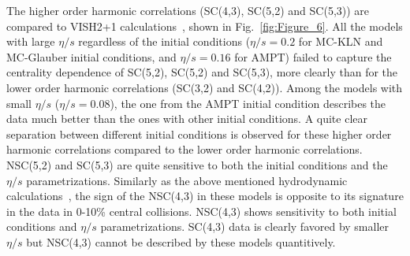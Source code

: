 The higher order harmonic correlations (SC(4,3), SC(5,2) and SC(5,3)) are compared to VISH2+1 calculations~\cite{Zhu:2016puf}, shown in Fig.~\ref{fig:Figure_6}. 
All the models with large $\eta/s$ regardless of the initial conditions ($\eta/s=0.2$ for MC-KLN and MC-Glauber initial conditions, and $\eta/s=0.16$ for AMPT) failed to capture the centrality dependence of SC(5,2), SC(5,2) and SC(5,3), more clearly than for the lower order harmonic correlations (SC(3,2) and SC(4,2)).
Among the models with small $\eta/s$ ($\eta/s=0.08$), the one from the AMPT initial condition describes the data much better than the ones with other initial conditions. 
A quite clear separation between different initial conditions is observed for these higher order harmonic correlations compared to the lower order harmonic correlations.
NSC(5,2) and SC(5,3) are quite sensitive to both the initial conditions and the $\eta/s$ parametrizations.
Similarly as the above mentioned hydrodynamic calculations~\cite{Niemi:2015qia}, the sign of the NSC(4,3) in these models is opposite to its signature in the data in 0-10\% central collisions. NSC(4,3) shows sensitivity to both initial conditions and $\eta/s$ parametrizations.
SC(4,3) data is clearly favored by smaller $\eta/s$ but NSC(4,3) cannot be described by these models quantitively.
     
